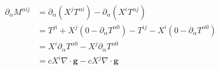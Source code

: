 \documentclass[12pt]{article}
\begin{document}
\begin{equation}
    \begin{split}
        \partial_{\alpha} M^{\alpha i j} &= \partial_{\alpha} (X^{j} T^{\alpha i}) - \partial_{\alpha} (X^{i} T^{\alpha j}) \\
        &= T^{ji} + X^{j} (0 - \partial_{\alpha} T^{\alpha 0}) - T^{ij} - X^{i} (0 - \partial_{\alpha} T^{\alpha 0}) \\
        &= X^{i} \partial_{\alpha} T^{\alpha 0} - X^{j} \partial_{\alpha} T^{\alpha 0} \\
        &= cX^{i} \nabla \cdot \mathbf{g} - cX^{j} \nabla \cdot \mathbf{g} \\
    \end{split}
\end{equation}
\end{document}
